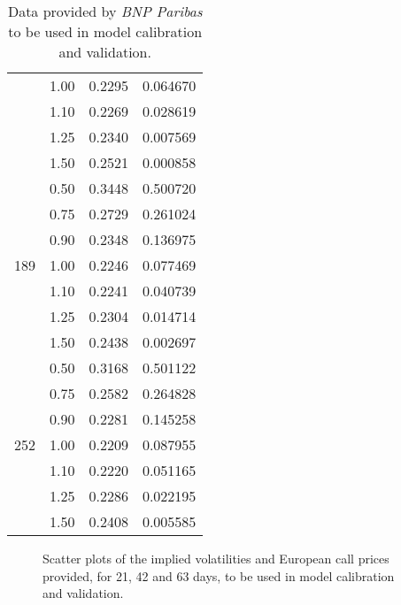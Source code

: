 \begin{table}[!htb]
\begin{adjustwidth}{0cm}{0cm}
\begin{subfigmatrix}{2}
{\begin{tabular}{@{}lccr@{}}
 & 1.00 & 0.2295 & 0.064670 \\
 & 1.10 & 0.2269 & 0.028619 \\
 & 1.25 & 0.2340 & 0.007569 \\
 & 1.50 & 0.2521 & 0.000858 \\ \midrule
\multirow{7}{*}{189} & 0.50 & 0.3448 & 0.500720 \\
 & 0.75 & 0.2729 & 0.261024 \\
 & 0.90 & 0.2348 & 0.136975 \\
 & 1.00 & 0.2246 & 0.077469 \\
 & 1.10 & 0.2241 & 0.040739 \\
 & 1.25 & 0.2304 & 0.014714 \\
 & 1.50 & 0.2438 & 0.002697 \\ \midrule
\multirow{7}{*}{252} & 0.50 & 0.3168 & 0.501122 \\
 & 0.75 & 0.2582 & 0.264828 \\
 & 0.90 & 0.2281 & 0.145258 \\
 & 1.00 & 0.2209 & 0.087955 \\
 & 1.10 & 0.2220 & 0.051165 \\
 & 1.25 & 0.2286 & 0.022195 \\
 & 1.50 & 0.2408 & 0.005585 \\ \bottomrule
\end{tabular}
}
  \end{subfigmatrix}
  \caption[Data provided by \emph{BNP Paribas} to be used in model calibration and validation.]{Data provided by \emph{BNP Paribas} to be used in model calibration and validation.}
  \label{tab:mktdata}
  \end{adjustwidth}
\end{table}



\begin{figure}[!htb]
  \begin{subfigmatrix}{2}
  \end{subfigmatrix}
  \caption[Scatter plots of the implied volatilities and European call prices provided, for 21, 42 and 63 days, to be used in model calibration and validation.]{Scatter plots of the implied volatilities and European call prices provided, for 21, 42 and 63 days, to be used in model calibration and validation.}
  \label{fig:mktdata}
\end{figure}


